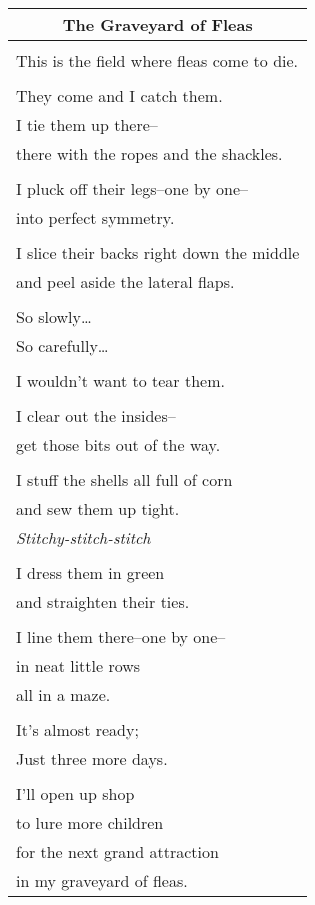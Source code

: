 \documentclass{article}
\begin{document}
\begin{center}
\begin{tabular}{l}
\multicolumn{1}{c}{\textbf{The Graveyard of Fleas}} \\ \hline
\\
This is the field where fleas come to die. \\
\\
They come and I catch them. \\
I tie them up there-- \\
there with the ropes and the shackles. \\
\\
I pluck off their legs--one by one-- \\
into perfect symmetry. \\
\\
I slice their backs right down the middle \\
and peel aside the lateral flaps. \\
\\
So slowly\ldots{} \\
So carefully\ldots{} \\
\\
I wouldn't want to tear them. \\
\\
I clear out the insides-- \\
get those bits out of the way. \\
\\
I stuff the shells all full of corn \\
and sew them up tight. \\
\textit{Stitchy-stitch-stitch} \\
\\
I dress them in green \\
and straighten their ties. \\
\\
I line them there--one by one-- \\
in neat little rows \\
all in a maze. \\
\\
It's almost ready; \\
Just three more days. \\
\\
I'll open up shop \\
to lure more children \\ %
for the next grand attraction \\ %
in my graveyard of fleas. \\
\end{tabular}
\end{center}
\end{document}
